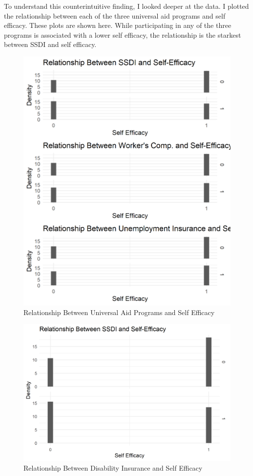 \documentclass[12pt]{paper}
\begin{document}
To understand this counterintuitive finding, I looked deeper at the data. I plotted the relationship between each of the three universal aid programs and self efficacy. These plots are shown here. While participating in any of the three programs is associated with a lower self efficacy, the relationship is the starkest between SSDI and self efficacy.

\begin{figure}[H]
	\includegraphics[scale=0.7]{Figs/uni_SE.png} \centering
	\caption{Relationship Between Universal Aid Programs and Self Efficacy}
	\label{}
\end{figure}

\begin{figure}[H]
	\includegraphics[scale=0.7]{Figs/disability_SE.png} \centering
	\caption{Relationship Between Disability Insurance and Self Efficacy}
	\label{}
\end{figure}
\end{document}
